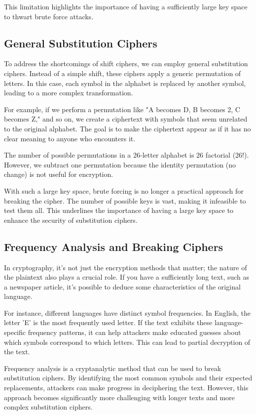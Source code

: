 \documentclass{class}
\begin{document}
This limitation highlights the importance of having a sufficiently large key space to thwart brute force attacks.

\subsection{General Substitution Ciphers}

To address the shortcomings of shift ciphers, we can employ general substitution ciphers. Instead of a simple shift, these ciphers apply a generic permutation of letters. In this case, each symbol in the alphabet is replaced by another symbol, leading to a more complex transformation.

For example, if we perform a permutation like "A becomes D, B becomes 2, C becomes Z," and so on, we create a ciphertext with symbols that seem unrelated to the original alphabet. The goal is to make the ciphertext appear as if it has no clear meaning to anyone who encounters it.

The number of possible permutations in a 26-letter alphabet is 26 factorial (26!). However, we subtract one permutation because the identity permutation (no change) is not useful for encryption.

With such a large key space, brute forcing is no longer a practical approach for breaking the cipher. The number of possible keys is vast, making it infeasible to test them all. This underlines the importance of having a large key space to enhance the security of substitution ciphers.

\subsection{Frequency Analysis and Breaking Ciphers}

In cryptography, it's not just the encryption methods that matter; the nature of the plaintext also plays a crucial role. If you have a sufficiently long text, such as a newspaper article, it's possible to deduce some characteristics of the original language.

For instance, different languages have distinct symbol frequencies. In English, the letter 'E' is the most frequently used letter. If the text exhibits these language-specific frequency patterns, it can help attackers make educated guesses about which symbols correspond to which letters. This can lead to partial decryption of the text.

Frequency analysis is a cryptanalytic method that can be used to break substitution ciphers. By identifying the most common symbols and their expected replacements, attackers can make progress in deciphering the text. However, this approach becomes significantly more challenging with longer texts and more complex substitution ciphers.
\end{document}

